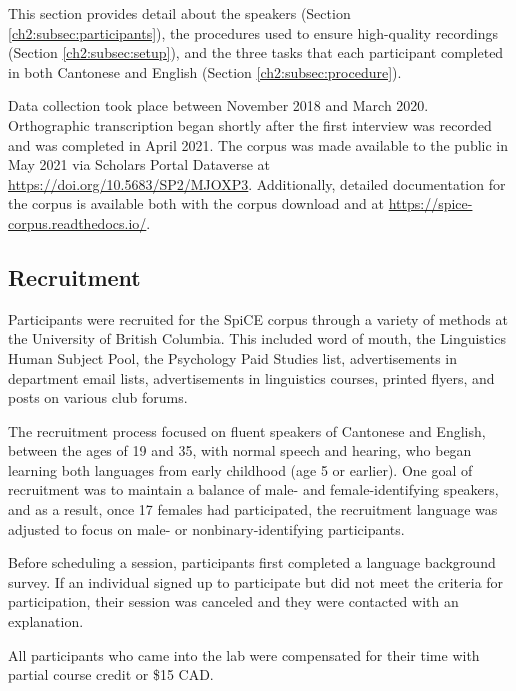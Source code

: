 This section provides detail about the speakers (Section \ref{ch2:subsec:participants}), the procedures used to ensure high-quality recordings (Section \ref{ch2:subsec:setup}), and the three tasks that each participant completed in both Cantonese and English (Section \ref{ch2:subsec:procedure}). 

Data collection took place between November 2018 and March 2020. Orthographic transcription began shortly after the first interview was recorded and was completed in April 2021. The corpus was made available to the public in May 2021 via Scholars Portal Dataverse at \url{https://doi.org/10.5683/SP2/MJOXP3}. Additionally, detailed documentation for the corpus is available both with the corpus download and at \url{https://spice-corpus.readthedocs.io/}.

\subsection{Recruitment}

Participants were recruited for the SpiCE corpus through a variety of methods at the University of British Columbia. This included word of mouth, the Linguistics Human Subject Pool, the Psychology Paid Studies list, advertisements in department email lists, advertisements in linguistics courses, printed flyers, and posts on various club forums. 

The recruitment process focused on fluent speakers of Cantonese and English, between the ages of 19 and 35, with normal speech and hearing, who began learning both languages from early childhood (age 5 or earlier). One goal of recruitment was to maintain a balance of male- and female-identifying speakers, and as a result, once 17 females had participated, the recruitment language was adjusted to focus on male- or nonbinary-identifying participants.

Before scheduling a session, participants first completed a language background survey. If an individual signed up to participate but did not meet the criteria for participation, their session was canceled and they were contacted with an explanation.

All participants who came into the lab were compensated for their time with partial course credit or \$15 CAD. 

